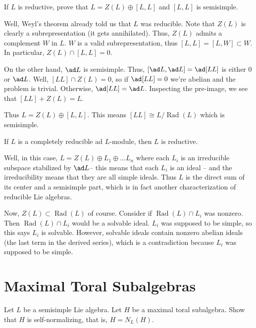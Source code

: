 \documentclass[11pt, headheight=30pt]{scrartcl}
\DeclareMathOperator{\Rad}{Rad}
\begin{document}
\begin{prob}
    If $L$ is reductive, prove that $L = Z(L) \oplus [L, L]$ and $[L, L]$ is semisimple.
\end{prob}
Well, Weyl's theorem already told us that $L$ was reducible.
Note that $Z(L)$ is clearly a subrepresentation (it gets annihilated).
Thus, $Z(L)$ admits a complement $W$ in $L$. $W$ is a valid
subrepresentation, thus $[L,L] = [L,W]\subset W$. In particular,
$Z(L)\cap [L,L] = 0$.

On the other hand, $\ad L$ is semisimple. Thus, $[\ad L, \ad L] = \ad [LL]$
is either $0$ or $\ad L$. Well, $[LL]\cap Z(L) = 0$, so if $\ad [LL] = 0$
we're abelian and the problem is trivial. Otherwise, $\ad [LL] = \ad L$.
Inspecting the pre-image, we see that $[LL] + Z(L) = L$.

Thus $L = Z(L) \oplus [L,L]$. This means $[LL]\cong L/\Rad(L)$ which
is semisimple.

\begin{prob}
    If $L$ is a completely reducible ad $L$-module, then $L$ is reductive.
\end{prob}
Well, in this case, $L = Z(L) \oplus L_1 \oplus \dots L_n$
where each $L_i$ is an irreducible subspace stabilized by $\ad L$--
this means that each $L_i$ is an ideal -- and the irreducibility
means that they are all simple ideals. Thus $L$ is the direct
sum of its center and a semisimple part, which is in fact
another characterization of reducible Lie algebras.

Now, $Z(L)\subset \Rad(L)$ of course. Consider if $\Rad(L)\cap L_i$
was nonzero. Then $\Rad(L)\cap L_i$
would be a solvable ideal. $L_i$ was supposed to be simple,
so this says $L_i$ is solvable. However, solvable ideals
contain nonzero abelian ideals (the last term in the derived series),
which is a contradiction because $L_i$ was supposed to be simple.

\section{Maximal Toral Subalgebras}
\begin{prob}
    Let $L$ be a semisimple Lie algebra. Let $H$ be a maximal toral subalgebra.
    Show that $H$ is self-normalizing, that is, $H = N_L(H)$.
\end{prob}
\end{document}
